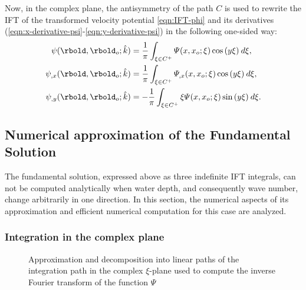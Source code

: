 Now, in the complex plane, the antisymmetry of the path $C$ is used to rewrite the IFT of the transformed velocity potential \eqref{eqn:IFT-phi} and its derivatives (\ref{eqn:x-derivative-psi}-\ref{eqn:y-derivative-psi}) in the following one-sided way:
%
\begin{align}
\label{eqn:IFT-phi-symmetric}
\psi(\rbold,\rbold_o; \hat{k}) &=
\dfrac{1}{\pi} \int_{\xi \in C^{+}} \varPsi (x,x_o;\xi) \cos{(y \xi)} \: d\xi, 
\\
%
\label{eqn:IFT-phi_x-symmetric}
\psi_{,x}(\rbold,\rbold_{o}; \hat{k}) &=
\dfrac{1}{\pi} \int_{\xi \in C^{+}}  \varPsi_{,x} (x,x_o;\xi)  \cos{(y \xi)} \: d\xi, 
\\
\label{eqn:IFT-phi_y-symmetric}
\psi_{,y}(\rbold,\rbold_{o}; \hat{k}) &=
-\dfrac{1}{\pi} \int_{\xi \in C^{+}} \xi  \varPsi (x,x_o;\xi) \sin{(y \xi)} \: d\xi. 
\end{align}

\subsection{Numerical approximation of the Fundamental Solution}
\label{subsec:NumericalFourierInversion}
The fundamental solution, expressed above as three indefinite IFT integrals, can not be computed analytically when water depth, and consequently wave number, change arbitrarily in one direction. In this section, the numerical aspects of its approximation and efficient numerical computation for this case are analyzed.

\subsubsection{Integration in the complex plane}

\begin{figure}
\centering
\def\svgwidth{\columnwidth}

\caption{Approximation and decomposition into linear paths of the integration path in the complex $\xi$-plane used to compute the inverse Fourier transform of the function $\Psi$}
\label{fig:IntegrationPath2}
\end{figure}

